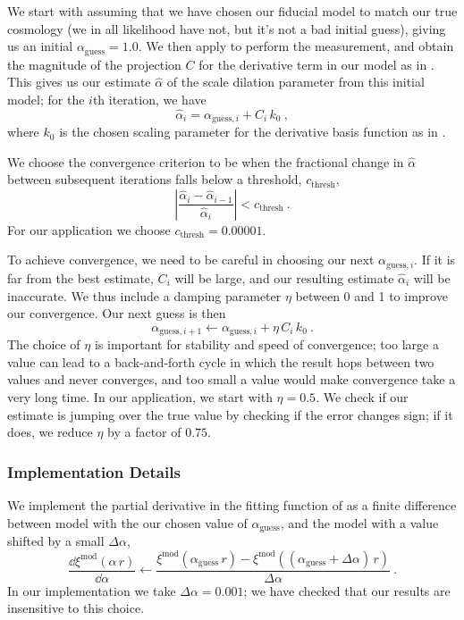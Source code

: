 We start with assuming that we have chosen our fiducial model to match our true cosmology (we in all likelihood have not, but it's not a bad initial guess), giving us an initial $\alpha_\mathrm{guess} = 1.0$. 
We then apply \est to perform the measurement, and obtain the magnitude of the projection $C$ for the derivative term in our model as in . 
This gives us our estimate $\hat{\alpha}$ of the scale dilation parameter from this initial model; for the $i$th iteration, we have
\begin{equation}
    \hat{\alpha}_{i} = \alpha_{\mathrm{guess},i} + C_i \, k_0 ~,
\end{equation}
where $k_0$ is the chosen scaling parameter for the derivative basis function as in .

We choose the convergence criterion to be when the fractional change in $\hat{\alpha}$ between subsequent iterations falls below a threshold, $c_\mathrm{thresh}$,
\begin{equation}
    \left| \frac{\hat{\alpha}_i - \hat{\alpha}_{i-1}}{\hat{\alpha}_i} \right| < c_\mathrm{thresh} ~.
\end{equation}
For our application we choose $c_\mathrm{thresh} = 0.00001$.

To achieve convergence, we need to be careful in choosing our next $\alpha_{\mathrm{guess},i}$.
If it is far from the best estimate, $C_i$ will be large, and our resulting estimate $\hat{\alpha}_{i}$ will be inaccurate.
We thus include a damping parameter $\eta$ between 0 and 1 to improve our convergence.
Our next guess is then
\begin{equation}
    \alpha_{\mathrm{guess},i+1} \leftarrow \alpha_{\mathrm{guess},i} + \eta\,C_i\,k_0 ~.
\end{equation}
The choice of $\eta$ is important for stability and speed of convergence; too large a value can lead to a back-and-forth cycle in which the result hops between two values and never converges, and too small a value would make convergence take a very long time.
In our application, we start with $\eta=0.5$.
We check if our estimate is jumping over the true value by checking if the error changes sign; if it does, we reduce $\eta$ by a factor of $0.75$.

\subsubsection{Implementation Details}

We implement the partial derivative in the fitting function of  as a finite difference between model with the our chosen value of $\alpha_\mathrm{guess}$, and the model with a value shifted by a small $\Delta \alpha$,
\begin{equation}
    \frac{\dd \xi^\mathrm{mod}(\alpha \, r)}{\dd \alpha} \leftarrow \frac{\xi^\mathrm{mod}(\alpha_\mathrm{guess} \, r) - \xi^\mathrm{mod}((\alpha_\mathrm{guess} + \Delta \alpha) \, r)}{\Delta \alpha} ~.
\end{equation}
In our implementation we take $\Delta \alpha = 0.001$; we have checked that our results are insensitive to this choice.

